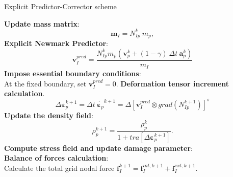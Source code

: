\message{ !name(2020_EFM_MPM_Eigensoftening.tex)}\documentclass[preprint,12pt,a4paper]{elsarticle}
\newcommand{\vec}[1]{
  \ensuremath{\mathbf{{#1}}}
}
\newcommand{\tens}[1]{
  \ensuremath{\mathbf{{#1}}}
}
\newcommand\Grad[1]{grad({#1})}
\begin{document}
\begin{algorithm}
  \renewcommand{\thealgorithm}{}
  \caption{Explicit Predictor-Corrector scheme}
  \begin{algorithmic}[1]
    \STATE \textbf{Update mass matrix}:
    \begin{equation*}
      \tens{m}_{I} = N_{Ip}^{k}\ m_p,
    \end{equation*}
    \STATE \textbf{Explicit Newmark Predictor}:\\
    \begin{equation*}
      \vec{v}_I^{pred} = \frac{ N_{Ip}^{k} m_p (\vec{v}_p^k + (1 - \gamma)\ \Delta t\ \vec{a}_p^k)}{m_I}
    \end{equation*}
    \STATE \textbf{Impose essential boundary conditions}:\\
    At the fixed boundary, set $\vec{v}_{I}^{pred} = 0$. 
    \STATE \textbf{Deformation tensor increment calculation}.
    \begin{equation*}
      \Delta \tens{\varepsilon}_{p}^{k+1} = \Delta t\
        \dot{\tens{\varepsilon}_{p}}^{k+1} = \Delta \left[ \vec{v}_{I}^{pred} \otimes
        \Grad{N_{Ip}^{k+1}} \right]^s
    \end{equation*}
    \STATE \textbf{Update the density field}:
    \begin{equation*}
      \rho_p^{k+1} = \frac{\rho_p^k}{1 + \mathit{tra}\left[\Delta\tens{\varepsilon}_{p}^{k+1}\right]}.
    \end{equation*}
    \STATE \textbf{Compute stress field and update damage parameter}:\\
    \STATE \textbf{Balance of forces calculation}:\\
    Calculate the total grid nodal force $\vec{f}_{I}^{k+1} =
    \vec{f}_{I}^{int,k+1} + \vec{f}_{I}^{ext,k+1}$.

\end{algorithmic}
\end{algorithm}
\end{document}
